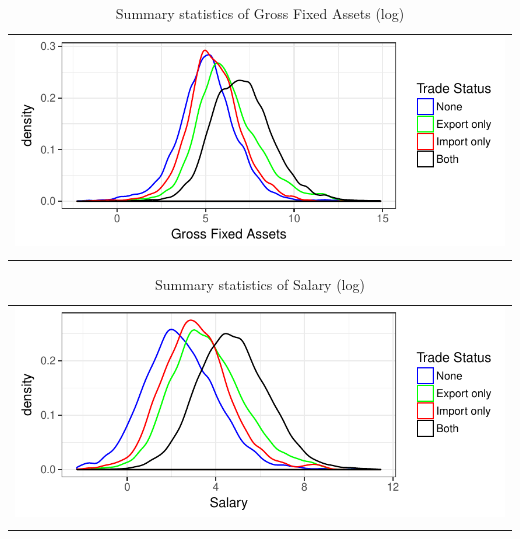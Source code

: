 \documentclass[11pt]{article}
\begin{document}
\begin{center}
\begin{table}[htp]
\caption{Summary statistics of Gross Fixed Assets (log)}
\label{lgfa}
\begin{tabular}{c}
 \includegraphics{./PICS/denslgfa.pdf}   \\ 
   \\  
\end{tabular}
\end{table}
\end{center}
\begin{center}
\begin{table}[htp]
\caption{Summary statistics of Salary (log)}
\label{tab:lsalary}
\begin{tabular}{c}
 \includegraphics{./PICS/denslsalary.pdf}   \\ 
   \\  
\end{tabular}
\end{table}
\end{center}
\end{document}
